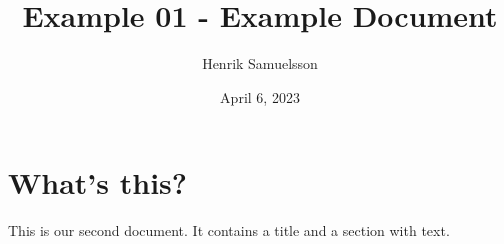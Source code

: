 \documentclass[a4paper,11pt]{article}
\title{Example 01 - Example Document}
\author{Henrik Samuelsson}
\date{April 6, 2023}
\begin{document}
\maketitle
\section{What's this?}
This is our second document. It contains a title and a section with text.
\end{document}
